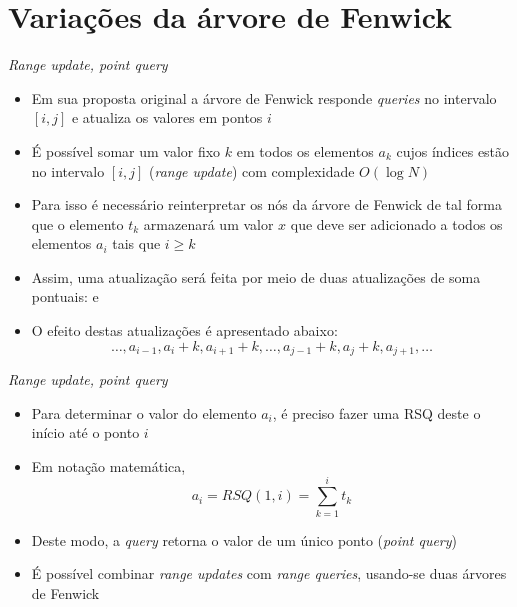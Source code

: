 \section{Variações da árvore de Fenwick}

\begin{frame}[fragile]{\it{Range update, point query}}

    \begin{itemize}
        \item Em sua proposta original a árvore de Fenwick responde \textit{queries} no 
            intervalo $[i, j]$ e atualiza os valores em pontos $i$

        \item É possível somar um valor fixo $k$ em todos os elementos $a_k$ cujos índices estão 
            no intervalo $[i, j]$ (\textit{range update}) com complexidade $O(\log N)$

        \item Para isso é necessário reinterpretar os nós da árvore de Fenwick de tal forma
            que o elemento $t_k$ armazenará um valor $x$ que deve ser adicionado a todos
            os elementos $a_i$ tais que $i\geq k$

        \item Assim, uma atualização  será feita por meio de duas
            atualizações de soma pontuais:  e 

        \item O efeito destas atualizações é apresentado abaixo:
        \[
            \ldots, a_{i - 1}, a_i + k, a_{i + 1} + k, \ldots, a_{j - 1} + k,
                a_j + k, a_{j + 1}, \ldots
        \]
    \end{itemize}

\end{frame}

\begin{frame}[fragile]{\it{Range update, point query}}

    \begin{itemize}
        \item Para determinar o valor do elemento $a_i$, é preciso
            fazer uma RSQ deste o início até o ponto $i$

        \item Em notação matemática,
        \[
            a_i = RSQ(1, i) = \sum_{k = 1}^i t_k
        \]

        \item Deste modo, a \textit{query} retorna o valor de um único ponto
            (\textit{point query})

        \item É possível combinar \textit{range updates} com \textit{range queries},
            usando-se duas árvores de Fenwick
    \end{itemize}

\end{frame}


